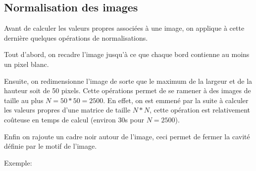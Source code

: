 \documentclass[a4paper,10pt]{article} %
\theoremstyle{definition} %
\begin{document}
\subsection{Normalisation des images}

Avant de calculer les valeurs propres associées à une image, on applique à cette dernière quelques opérations de normalisations.

Tout d'abord, on recadre l'image jusqu'à ce que chaque bord contienne au moins un pixel blanc.

Ensuite, on redimensionne l'image de sorte que le maximum de la largeur et de la hauteur soit de 50 pixels. Cette opérations permet de se ramener à des images de taille au plus $N = 50*50 = 2500$. En effet, on est emmené par la suite à calculer les valeurs propres d'une matrice de taille $N*N$, cette opération est relativement coûteuse en temps de calcul (environ 30s pour $N = 2500$).

Enfin on rajoute un cadre noir autour de l'image, ceci permet de fermer la cavité définie par le motif de l'image.

Exemple:
\end{document}

